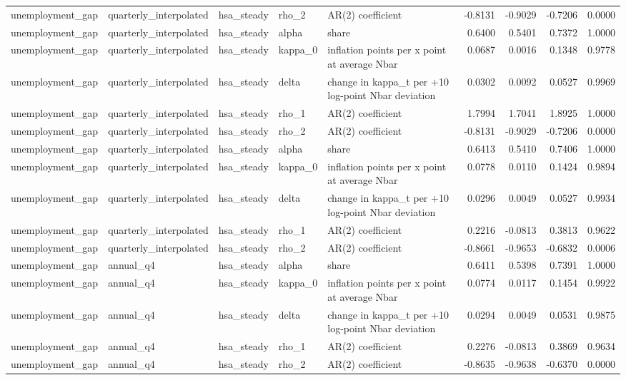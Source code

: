 \begin{tabular}{lllllrrrr}
unemployment\_gap & quarterly\_interpolated & hsa\_steady & rho\_2 & AR(2) coefficient & -0.8131 & -0.9029 & -0.7206 & 0.0000 \\
unemployment\_gap & quarterly\_interpolated & hsa\_steady & alpha & share & 0.6400 & 0.5401 & 0.7372 & 1.0000 \\
unemployment\_gap & quarterly\_interpolated & hsa\_steady & kappa\_0 & inflation points per x point at average Nbar & 0.0687 & 0.0016 & 0.1348 & 0.9778 \\
unemployment\_gap & quarterly\_interpolated & hsa\_steady & delta & change in kappa\_t per +10 log-point Nbar deviation & 0.0302 & 0.0092 & 0.0527 & 0.9969 \\
unemployment\_gap & quarterly\_interpolated & hsa\_steady & rho\_1 & AR(2) coefficient & 1.7994 & 1.7041 & 1.8925 & 1.0000 \\
unemployment\_gap & quarterly\_interpolated & hsa\_steady & rho\_2 & AR(2) coefficient & -0.8131 & -0.9029 & -0.7206 & 0.0000 \\
unemployment\_gap & quarterly\_interpolated & hsa\_steady & alpha & share & 0.6413 & 0.5410 & 0.7406 & 1.0000 \\
unemployment\_gap & quarterly\_interpolated & hsa\_steady & kappa\_0 & inflation points per x point at average Nbar & 0.0778 & 0.0110 & 0.1424 & 0.9894 \\
unemployment\_gap & quarterly\_interpolated & hsa\_steady & delta & change in kappa\_t per +10 log-point Nbar deviation & 0.0296 & 0.0049 & 0.0527 & 0.9934 \\
unemployment\_gap & quarterly\_interpolated & hsa\_steady & rho\_1 & AR(2) coefficient & 0.2216 & -0.0813 & 0.3813 & 0.9622 \\
unemployment\_gap & quarterly\_interpolated & hsa\_steady & rho\_2 & AR(2) coefficient & -0.8661 & -0.9653 & -0.6832 & 0.0006 \\
unemployment\_gap & annual\_q4 & hsa\_steady & alpha & share & 0.6411 & 0.5398 & 0.7391 & 1.0000 \\
unemployment\_gap & annual\_q4 & hsa\_steady & kappa\_0 & inflation points per x point at average Nbar & 0.0774 & 0.0117 & 0.1454 & 0.9922 \\
unemployment\_gap & annual\_q4 & hsa\_steady & delta & change in kappa\_t per +10 log-point Nbar deviation & 0.0294 & 0.0049 & 0.0531 & 0.9875 \\
unemployment\_gap & annual\_q4 & hsa\_steady & rho\_1 & AR(2) coefficient & 0.2276 & -0.0813 & 0.3869 & 0.9634 \\
unemployment\_gap & annual\_q4 & hsa\_steady & rho\_2 & AR(2) coefficient & -0.8635 & -0.9638 & -0.6370 & 0.0000 \\

\end{tabular}
